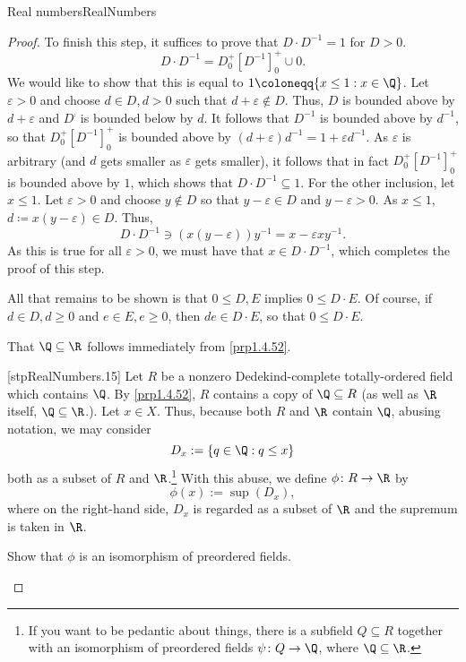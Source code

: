 \begin{thm}{Real numbers}{RealNumbers}
\begin{proof}
To finish this step, it suffices to prove that $D\cdot D^{-1}=1$ for $D>0$.
\begin{equation}
D\cdot D^{-1}=D_0^+[D^{-1}]_0^+\cup 0.
\end{equation}
We would like to show that this is equal to $1\coloneqq \{ x\leq 1:x\in \Q \}$.  Let $\varepsilon >0$ and choose $d\in D,d>0$ such that $d+\varepsilon \notin D$.  Thus, $D$ is bounded above by $d+\varepsilon$ and $D^{\comp}$ is bounded below by $d$.  It follows that $D^{-1}$ is bounded above by $d^{-1}$, so that $D_0^+[D^{-1}]_0^+$ is bounded above by $(d+\varepsilon )d^{-1}=1+\varepsilon d^{-1}$.  As $\varepsilon$ is arbitrary (and $d$ gets smaller as $\varepsilon$ gets smaller), it follows that in fact $D_0^+[D^{-1}]_0^+$ is bounded above by $1$, which shows that $D\cdot D^{-1}\subseteq 1$.  For the other inclusion, let $x\leq 1$.  Let $\varepsilon >0$ and choose $y\notin D$ so that $y-\varepsilon \in D$ and $y-\varepsilon >0$.  As $x\leq 1$, $d\coloneqq x(y-\varepsilon )\in D$.  Thus,
\begin{equation}
D\cdot D^{-1}\ni \left( x(y-\varepsilon )\right) y^{-1}=x-\varepsilon xy^{-1}.
\end{equation}
As this is true for all $\varepsilon >0$, we must have that $x\in D\cdot D^{-1}$, which completes the proof of this step.

All that remains to be shown is that $0\leq D,E$ implies $0\leq D\cdot E$.  Of course, if $d\in D,d\geq 0$ and $e\in E,e\geq 0$, then $de\in D\cdot E$, so that $0\leq D\cdot E$.

That $\Q \subseteq \R$ follows immediately from \cref{prp1.4.52}.

[stpRealNumbers.15]
Let $R$ be a nonzero Dedekind-complete totally-ordered field which contains $\Q$.  By \cref{prp1.4.52}, $R$ contains a copy of $\Q \subseteq R$ (as well as $\R$ itself, $\Q \subseteq \R$.).  Let $x\in X$.  Thus, because both $R$ and $\R$ contain $\Q$, abusing notation, we may consider
\begin{equation}
D_x:=\left\{ q\in \Q :q\leq x\right\}
\end{equation}
both as a subset of $R$ and $\R$.\footnote{If you want to be pedantic about things, there is a subfield $Q\subseteq R$ together with an isomorphism of preordered fields $\psi \colon Q\rightarrow \Q$, where $\Q \subseteq \R$.}  With this abuse, we define $\phi \colon R\rightarrow \R$ by
\begin{equation}
\phi (x):=\sup (D_x),
\end{equation}
where on the right-hand side, $D_x$ is regarded as a subset of $\R$ and the supremum is taken in $\R$.
\begin{exr}[breakable=false]{}{}
Show that $\phi$ is an isomorphism of preordered fields.
\end{exr}


\end{proof}
\end{thm}
